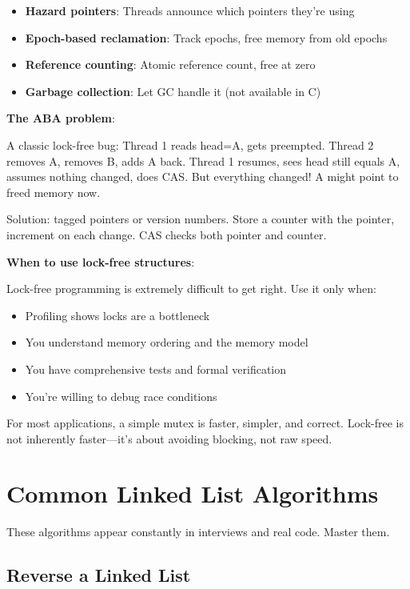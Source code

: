 \begin{itemize}
    \item \textbf{Hazard pointers}: Threads announce which pointers they're using
    \item \textbf{Epoch-based reclamation}: Track epochs, free memory from old epochs
    \item \textbf{Reference counting}: Atomic reference count, free at zero
    \item \textbf{Garbage collection}: Let GC handle it (not available in C)
\end{itemize}

\textbf{The ABA problem}:

A classic lock-free bug: Thread 1 reads head=A, gets preempted. Thread 2 removes A, removes B, adds A back. Thread 1 resumes, sees head still equals A, assumes nothing changed, does CAS. But everything changed! A might point to freed memory now.

Solution: tagged pointers or version numbers. Store a counter with the pointer, increment on each change. CAS checks both pointer and counter.

\textbf{When to use lock-free structures}:

Lock-free programming is extremely difficult to get right. Use it only when:
\begin{itemize}
    \item Profiling shows locks are a bottleneck
    \item You understand memory ordering and the memory model
    \item You have comprehensive tests and formal verification
    \item You're willing to debug race conditions
\end{itemize}

For most applications, a simple mutex is faster, simpler, and correct. Lock-free is not inherently faster---it's about avoiding blocking, not raw speed.

\section{Common Linked List Algorithms}

These algorithms appear constantly in interviews and real code. Master them.

\subsection{Reverse a Linked List}

